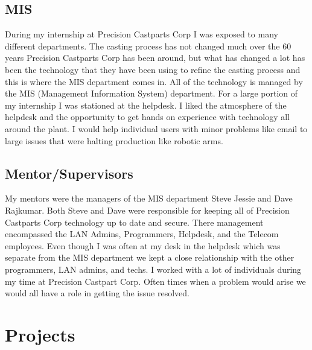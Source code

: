 \documentclass[letterpaper,10pt,notitlepage,fleqn]{article}
\begin{document}
\subsection{MIS}
\indent During my internship at Precision Castparts Corp I was exposed to many 
different departments. The casting process has not changed much over the 60 years 
Precision Castparts Corp has been around, but what has changed a lot has been the 
technology that they have been using to refine the casting process and this is where 
the MIS department comes in. All of the technology is managed by the MIS 
(Management Information System) department. For a large 
portion of my internship I was stationed at the helpdesk. I liked the atmosphere 
of the helpdesk and the opportunity to get hands on experience with technology all
around the plant. I would help individual users with minor problems like email 
to large issues that were halting production like robotic arms. 

\subsection{Mentor/Supervisors}
\indent My mentors were the managers of the MIS department Steve Jessie and Dave 
Rajkumar. Both Steve and 
Dave were responsible for keeping all of Precision Castparts Corp technology up 
to date and secure. There management encompassed the LAN Admins, Programmers, 
Helpdesk, and the Telecom employees. Even though I was often at my desk in the 
helpdesk which was separate from the MIS department we kept a close relationship 
with the other programmers, LAN admins, and techs. I worked with a lot of individuals 
during my time at Precision Castpart Corp. Often times when a problem would arise 
we would all have a role in getting the issue resolved. 

\section{Projects}
\end{document}
